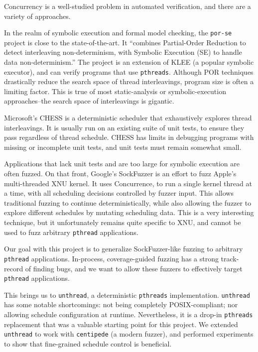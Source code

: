 \documentclass{article}
\begin{document}
Concurrency is a well-studied problem in automated verification, and there are a variety of approaches. 

In the realm of symbolic execution and formal model checking, the \texttt{por-se}\cite{por-se} project is close to the state-of-the-art. It ``combines Partial-Order Reduction to detect interleaving non-determinism, with Symbolic Execution (SE) to handle data non-determinism.'' The project is an extension of KLEE (a popular symbolic executor), and can verify programs that use \texttt{pthreads}. Although POR techniques drastically reduce the search space of thread interleavings, program size is often a limiting factor. This is true of most static-analysis or symbolic-execution approaches--the search space of interleavings is gigantic.

Microsoft's CHESS\cite{chess} is a deterministic scheduler that exhaustively explores thread interleavings. It is usually run on an existing suite of unit tests, to ensure they pass regardless of thread schedule. CHESS has limits in debugging programs with missing or incomplete unit tests, and unit tests must remain somewhat small.

Applications that lack unit tests and are too large for symbolic execution are often fuzzed. On that front, Google's SockFuzzer\cite{sockfuzzer} is an effort to fuzz Apple's multi-threaded XNU kernel. It uses Concurrence\cite{concurrence}\cite{concurrence_presentation}, to run a single kernel thread at a time, with all scheduling decisions controlled by fuzzer input. This allows traditional fuzzing to continue deterministically, while also allowing the fuzzer to explore different schedules by mutating scheduling data. This is a very interesting technique, but it unfortunately remains quite specific to XNU, and cannot be used to fuzz arbitrary \texttt{pthread} applications.

\sloppy
Our goal with this project is to generalize SockFuzzer-like fuzzing to arbitrary \texttt{pthread} applications. In-process, coverage-guided fuzzing has a strong track-record of finding bugs, and we want to allow these fuzzers to effectively target \texttt{pthread} applications.

This brings us to \texttt{unthread}\cite{unthread}, a deterministic \texttt{pthreads} implementation. \texttt{unthread} has some notable shortcomings: not being completely POSIX-compliant; nor allowing schedule configuration at runtime. Nevertheless, it is a drop-in \texttt{pthreads} replacement that was a valuable starting point for this project. We extended \texttt{unthread} to work with \texttt{centipede} (a modern fuzzer), and performed experiments to show that fine-grained schedule control is beneficial. 
\end{document}
